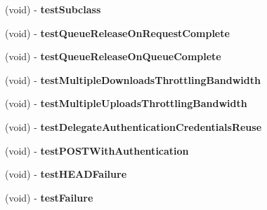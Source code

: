 \begin{DoxyCompactItemize}
\item 
\hypertarget{interface_a_s_i_network_queue_tests_a6c75d4f9034d8f96da30002fa7c39f6a}{
(void) -\/ {\bfseries test\-Subclass}}
\label{interface_a_s_i_network_queue_tests_a6c75d4f9034d8f96da30002fa7c39f6a}

\item 
\hypertarget{interface_a_s_i_network_queue_tests_a6ebc6405b8f6639be717def3dcbcd617}{
(void) -\/ {\bfseries test\-Queue\-Release\-On\-Request\-Complete}}
\label{interface_a_s_i_network_queue_tests_a6ebc6405b8f6639be717def3dcbcd617}

\item 
\hypertarget{interface_a_s_i_network_queue_tests_a8367da7729b914e691602cbfbb0cd4d6}{
(void) -\/ {\bfseries test\-Queue\-Release\-On\-Queue\-Complete}}
\label{interface_a_s_i_network_queue_tests_a8367da7729b914e691602cbfbb0cd4d6}

\item 
\hypertarget{interface_a_s_i_network_queue_tests_afecabb41732addf7e0b63960536af284}{
(void) -\/ {\bfseries test\-Multiple\-Downloads\-Throttling\-Bandwidth}}
\label{interface_a_s_i_network_queue_tests_afecabb41732addf7e0b63960536af284}

\item 
\hypertarget{interface_a_s_i_network_queue_tests_a3c936cbdc4d5d95c086acccc6b61a277}{
(void) -\/ {\bfseries test\-Multiple\-Uploads\-Throttling\-Bandwidth}}
\label{interface_a_s_i_network_queue_tests_a3c936cbdc4d5d95c086acccc6b61a277}

\item 
\hypertarget{interface_a_s_i_network_queue_tests_ad451f41961e411ca4e0a493564f3782e}{
(void) -\/ {\bfseries test\-Delegate\-Authentication\-Credentials\-Reuse}}
\label{interface_a_s_i_network_queue_tests_ad451f41961e411ca4e0a493564f3782e}

\item 
\hypertarget{interface_a_s_i_network_queue_tests_aa73ecf9606cf1826f4137aef4ff343be}{
(void) -\/ {\bfseries test\-P\-O\-S\-T\-With\-Authentication}}
\label{interface_a_s_i_network_queue_tests_aa73ecf9606cf1826f4137aef4ff343be}

\item 
\hypertarget{interface_a_s_i_network_queue_tests_aa50e545358ffc84eea2a4f61e6d782eb}{
(void) -\/ {\bfseries test\-H\-E\-A\-D\-Failure}}
\label{interface_a_s_i_network_queue_tests_aa50e545358ffc84eea2a4f61e6d782eb}

\item 
\hypertarget{interface_a_s_i_network_queue_tests_a676be0402a758bbd669e8b11f7bb368d}{
(void) -\/ {\bfseries test\-Failure}}
\label{interface_a_s_i_network_queue_tests_a676be0402a758bbd669e8b11f7bb368d}


\end{DoxyCompactItemize}
